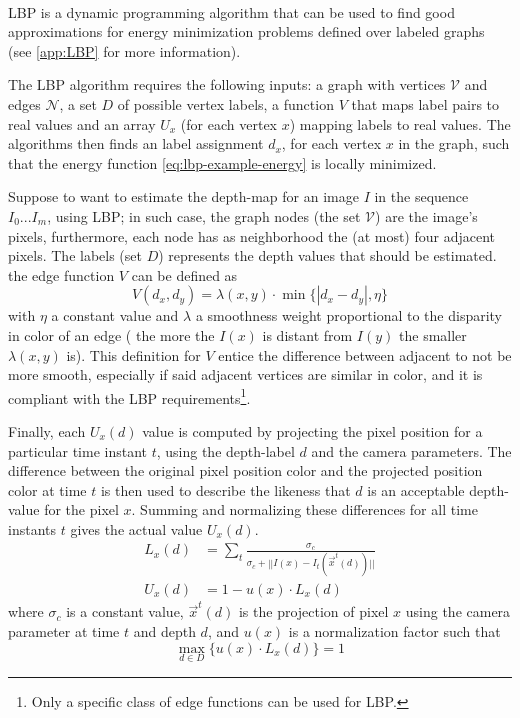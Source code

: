 \documentclass[notitlepage,english]{hgbreport}
\newcommand{\Acronym}[1]{{#1}}
\newcommand{\LBP}{\Acronym{LBP}}
\newcommand{\Vertices}{\mathcal{V}}
\newcommand{\Edges}{\mathcal{N}}
\begin{document}
\paragraph{}
\LBP{} is a dynamic programming algorithm that can be used to find good approximations for energy minimization problems defined over labeled graphs (see \cref{app:LBP} for more information).




The \LBP{} algorithm requires the following inputs: a graph with vertices $\Vertices$ and edges $\Edges$, a set $D$ of possible vertex labels, a function $V$ that maps label pairs to real values and an array $U_x$ (for each vertex $x$) mapping labels to real values. The algorithms then  finds an label assignment $d_x$, for each vertex $x$ in the graph, such that the energy function \ref{eq:lbp-example-energy} is locally minimized.

Suppose to want to estimate the depth-map for an image $I$ in the sequence $I_0 ... I_m$, using \LBP; in such case, the graph nodes (the set $\Vertices$) are the image's pixels, furthermore, each node has as neighborhood the (at most) four adjacent pixels.
The labels (set $D$) represents the depth values that should be estimated. 
the edge function $V$ can be defined as
$$
V(d_x, d_y) = \lambda(x,y)\cdot\min\{|d_x - d_y|, \eta\}
$$
with $\eta$ a constant value and $\lambda$ a smoothness weight proportional to the disparity in color of an edge (\ie{} the more the $I(x)$ is distant from $I(y)$ the smaller $\lambda(x,y)$ is).
This definition for $V$ entice the difference between adjacent to not be more smooth, especially if said adjacent vertices are similar in color, and it is compliant with the \LBP{} requirements\footnote{Only a specific class of edge functions can be used for \LBP.}.

Finally, each $U_x(d)$ value is computed by projecting the pixel position  for a particular time instant $t$, using the depth-label $d$ and the camera parameters. The difference between the original pixel position color and the projected position color at time $t$ is then used to describe the likeness that $d$ is an acceptable depth-value for the pixel $x$. Summing and normalizing these differences for all time instants $t$ gives the actual value $U_x(d)$.
{
	\newcommand{\Projected}{\overrightarrow x^t(d)}
\begin{align}
	L_x(d) &= \sum_{t} \frac{\sigma_c}{\sigma_c + ||I(x) - I_t(\Projected)||}\\
	U_x(d) &= 1 - u(x) \cdot L_x(d)
\end{align}
where $\sigma_c$ is a constant value, $\Projected$ is the projection of pixel $x$ using the camera parameter at time $t$ and depth $d$, and $u(x)$ is a normalization factor such that 
$$\max_{d\in D} \{u(x)\cdot L_x(d)\} = 1$$
}
\end{document}
